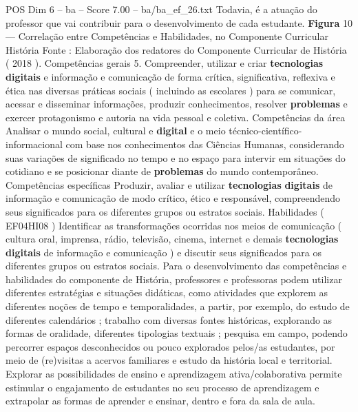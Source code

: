 \begin{textsample}{POS Dim 6 – ba – Score 7.00 – ba/ba\_ef\_26.txt}
Todavia, é a atuação do professor que vai contribuir para o desenvolvimento de cada estudante. \textbf{Figura} 10 — Correlação entre Competências e Habilidades, no Componente Curricular História Fonte : Elaboração dos redatores do Componente Curricular de História ( 2018 ).
Competências gerais 5.
Compreender, utilizar e criar \textbf{tecnologias} \textbf{digitais} e informação e comunicação de forma crítica, significativa, reflexiva e ética nas diversas práticas sociais ( incluindo as escolares ) para se comunicar, acessar e disseminar informações, produzir conhecimentos, resolver \textbf{problemas} e exercer protagonismo e autoria na vida pessoal e coletiva.
Competências da área Analisar o mundo social, cultural e \textbf{digital} e o meio técnico-científico-informacional com base nos conhecimentos das Ciências Humanas, considerando suas variações de significado no tempo e no espaço para intervir em situações do cotidiano e se posicionar diante de \textbf{problemas} do mundo contemporâneo.
Competências específicas Produzir, avaliar e utilizar \textbf{tecnologias} \textbf{digitais} de informação e comunicação de modo crítico, ético e responsável, compreendendo seus significados para os diferentes grupos ou estratos sociais.
Habilidades ( EF04HI08 ) Identificar as transformações ocorridas nos meios de comunicação ( cultura oral, imprensa, rádio, televisão, cinema, internet e demais \textbf{tecnologias} \textbf{digitais} de informação e comunicação ) e discutir seus significados para os diferentes grupos ou estratos sociais.
Para o desenvolvimento das competências e habilidades do componente de História, professores e professoras podem utilizar diferentes estratégias e situações didáticas, como atividades que explorem as diferentes noções de tempo e temporalidades, a partir, por exemplo, do estudo de diferentes calendários ; trabalho com diversas fontes históricas, explorando as formas de oralidade, diferentes tipologias textuais ; pesquisa em campo, podendo percorrer espaços desconhecidos ou pouco explorados pelos/as estudantes, por meio de (re)visitas a acervos familiares e estudo da história local e territorial.
Explorar as possibilidades de ensino e aprendizagem ativa/colaborativa permite estimular o engajamento de estudantes no seu processo de aprendizagem e extrapolar as formas de aprender e ensinar, dentro e fora da sala de aula.

\end{textsample}
